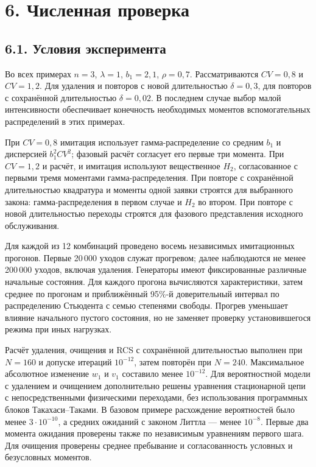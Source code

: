 \section*{6. Численная проверка}
\subsection*{6.1. Условия эксперимента}
Во всех примерах \(n=3\), \(\lambda=1\), \(b_1=2{,}1\), \(\rho=0{,}7.\) Рассматриваются \(CV=0{,}8\) и \(CV=1{,}2.\) Для удаления и повторов с новой длительностью \(\delta=0{,}3\), для повторов с сохранённой длительностью \(\delta=0{,}02.\) В последнем случае выбор малой интенсивности обеспечивает конечность необходимых моментов вспомогательных распределений в этих примерах.

При \(CV=0{,}8\) имитация использует гамма-распределение со средним \(b_1\) и дисперсией \(b_1^2CV^2\); фазовый расчёт согласует его первые три момента. При \(CV=1{,}2\) и расчёт, и имитация используют вещественное \(H_2\), согласованное с первыми тремя моментами гамма-распределения. При повторе с сохранённой длительностью квадратура и моменты одной заявки строятся для выбранного закона: гамма-распределения в первом случае и \(H_2\) во втором. При повторе с новой длительностью переходы строятся для фазового представления исходного обслуживания.

Для каждой из 12 комбинаций проведено восемь независимых имитационных прогонов. Первые 20\,000 уходов служат прогревом; далее наблюдаются не менее 200\,000 уходов, включая удаления. Генераторы имеют фиксированные различные начальные состояния. Для каждого прогона вычисляются характеристики, затем среднее по прогонам и приближённый 95\%-й доверительный интервал по распределению Стьюдента с семью степенями свободы. Прогрев уменьшает влияние начального пустого состояния, но не заменяет проверку установившегося режима при иных нагрузках.

Расчёт удаления, очищения и RCS с сохранённой длительностью выполнен при \(N=160\) и допуске итераций \(10^{-12}\), затем повторён при \(N=240.\) Максимальное абсолютное изменение \(w_1\) и \(v_1\) составило менее \(10^{-12}.\) Для вероятностной модели с удалением и очищением дополнительно решены уравнения стационарной цепи с непосредственными физическими переходами, без использования программных блоков Такахаси--Таками. В базовом примере расхождение вероятностей было менее \(3\cdot10^{-10}\), а средних ожиданий с законом Литтла --- менее \(10^{-8}.\) Первые два момента ожидания проверены также по независимым уравнениям первого шага. Для очищения проверены среднее пребывание и согласованность условных и безусловных моментов.

